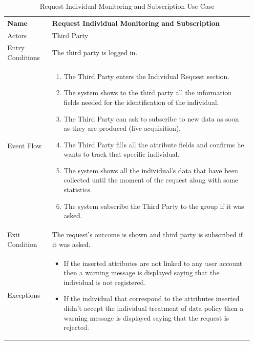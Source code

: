 \begin{enumerate}
\FloatBarrier
\begin{table}[h]
\begin{tabular}{|p{3.4cm}|p{}|}
\hline
Name             & Request Individual Monitoring and Subscription\\ \hline
Actors           & Third Party  \\ \hline
Entry Conditions & The third party is logged in.    \\ \hline
Event Flow       & \begin{enumerate}
            \item The Third Party enters the Individual Request section.         
            \item The system shows to the third party all the information fields needed for the identification of the individual.
            \item The Third Party can ask to subscribe to new data as soon as they are produced (live acquisition).
            \item The Third Party fills all the attribute fields and confirms he wants to track that specific individual.
            \item The system shows all the individual's data that have been collected until the moment of the request along with some statistics. 
            \item The system subscribe the Third Party to the group if it was asked. 
        \end{enumerate}\\ \hline
Exit Condition   & The request's outcome is shown and third party is subscribed if it was asked.\\ \hline
Exceptions       & \begin{itemize}
\item If the inserted attributes are not linked to any user account then a warning message is displayed saying that the individual is not registered.
\item If the individual that correspond to the attributes inserted didn't accept the individual treatment of data policy then a warning message is displayed saying that the request is rejected.
\end{itemize}\\ \hline
\end{tabular}
\caption{Request Individual Monitoring and Subscription Use Case}
\end{table}
\FloatBarrier


\end{enumerate}
